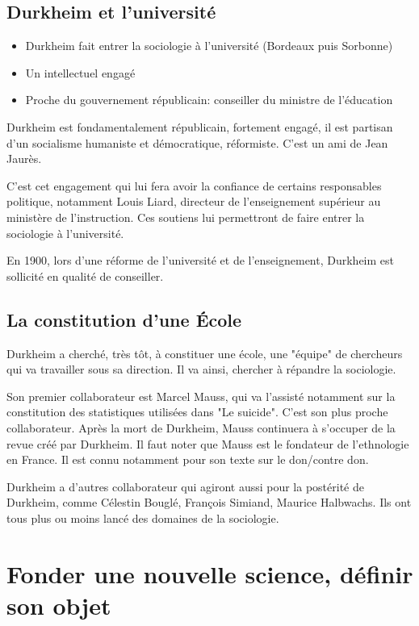 \documentclass[10pt, a4paper, openany]{book}
\begin{document}
\subsection{Durkheim et l'université}
\begin{itemize}
\item Durkheim fait entrer la sociologie à l'université (Bordeaux puis Sorbonne)
\item Un intellectuel engagé
\item Proche du gouvernement républicain: conseiller du ministre de l'éducation
\end{itemize}

Durkheim est fondamentalement républicain, fortement engagé, il est partisan d'un socialisme humaniste et démocratique, réformiste. C'est un ami de Jean Jaurès.

C'est cet engagement qui lui fera avoir la confiance de certains responsables politique, notamment Louis Liard, directeur de l'enseignement supérieur au ministère de l'instruction. Ces soutiens lui permettront de faire entrer la sociologie à l'université.

En 1900, lors d'une réforme de l'université et de l'enseignement, Durkheim est sollicité en qualité de conseiller. 

\subsection{La constitution d'une École}
Durkheim a cherché, très tôt, à constituer une école, une "équipe" de chercheurs qui va travailler sous sa direction. Il va ainsi, chercher à répandre la sociologie.

Son premier collaborateur est Marcel Mauss, qui va l'assisté notamment sur la constitution des statistiques utilisées dans "Le suicide". C'est son plus proche collaborateur. Après la mort de Durkheim, Mauss continuera à s'occuper de la revue créé par Durkheim. Il faut noter que Mauss est le fondateur de l'ethnologie en France. Il est connu notamment pour son texte sur le don/contre don.

Durkheim a d'autres collaborateur qui agiront aussi pour la postérité de Durkheim, comme Célestin Bouglé, François Simiand, Maurice Halbwachs. Ils ont tous plus ou moins lancé des domaines de la sociologie.


\section{Fonder une nouvelle science, définir son objet}
\end{document}
